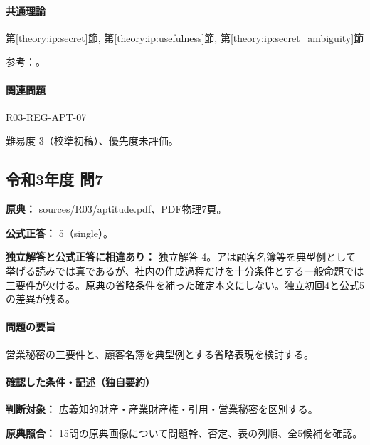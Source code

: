 \paragraph{共通理論} \hyperref[theory:ip:secret]{第\ref*{theory:ip:secret}節}, \hyperref[theory:ip:usefulness]{第\ref*{theory:ip:usefulness}節}, \hyperref[theory:ip:secret_ambiguity]{第\ref*{theory:ip:secret_ambiguity}節}

\par 参考：\cite{ip_unfair_statute,ip_secret_handbook2017}。

\paragraph{関連問題} \hyperref[q:r03-reg-apt-07]{R03-REG-APT-07}

\par 難易度 3（校準初稿）、優先度未評価。

\subsection{令和3年度 問7}
\label{q:r03-reg-apt-07}

\noindent\textbf{原典：} sources/R03/aptitude.pdf、PDF物理7頁。

\textbf{公式正答：} 5（single）。

\par\textbf{独立解答と公式正答に相違あり：} 独立解答 4。アは顧客名簿等を典型例として挙げる読みでは真であるが、社内の作成過程だけを十分条件とする一般命題では三要件が欠ける。原典の省略条件を補った確定本文にしない。独立初回4と公式5の差異が残る。

\paragraph{問題の要旨} 営業秘密の三要件と、顧客名簿を典型例とする省略表現を検討する。

\paragraph{確認した条件・記述（独自要約）}\mbox{}\par

\noindent\textbf{判断対象：} 広義知的財産・産業財産権・引用・営業秘密を区別する。\par

\noindent\textbf{原典照合：} 15問の原典画像について問題幹、否定、表の列順、全5候補を確認。\par

